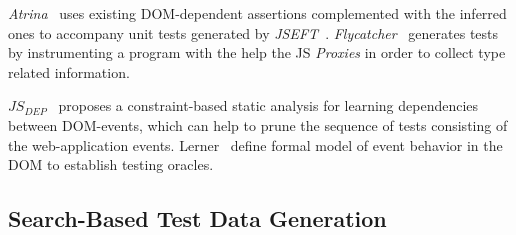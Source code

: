 \documentclass[sigconf,review]{acmart}
\begin{document}
\emph{Atrina}~\cite{icst16} uses existing DOM-dependent assertions complemented with the inferred ones to accompany unit tests generated by \emph{JSEFT}~\cite{mirshokraie2015jseft}. \emph{Flycatcher}~\cite{de2012automatic} generates tests by instrumenting a program with the help the JS \emph{Proxies} in order to collect type related information.

\emph{$JS_{DEP}$}~\cite{sung2016static} proposes a constraint-based static analysis for learning dependencies between DOM-events, which can help to prune the sequence of tests consisting of the web-application events. Lerner~\cite{lerner2012modeling} define formal model of event behavior in the DOM to establish testing oracles.
















\subsection{Search-Based Test Data Generation}
\label{sub.sec.search.based}
\end{document}
